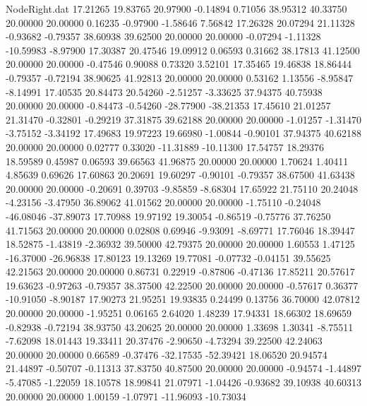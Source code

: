 \begin{filecontents}{NodeRight.dat}
  17.21265   19.83765   20.97900    -0.14894    0.71056   38.95312   40.33750   20.00000   20.00000    0.16235   -0.97900   -1.58646    7.56842
  17.26328   20.07294   21.11328    -0.93682   -0.79357   38.60938   39.62500   20.00000   20.00000   -0.07294   -1.11328  -10.59983   -8.97900
  17.30387   20.47546   19.09912     0.06593    0.31662   38.17813   41.12500   20.00000   20.00000   -0.47546    0.90088    0.73320    3.52101
  17.35465   19.46838   18.86444    -0.79357   -0.72194   38.90625   41.92813   20.00000   20.00000    0.53162    1.13556   -8.95847   -8.14991
  17.40535   20.84473   20.54260    -2.51257   -3.33625   37.94375   40.75938   20.00000   20.00000   -0.84473   -0.54260  -28.77900  -38.21353
  17.45610   21.01257   21.31470    -0.32801   -0.29219   37.31875   39.62188   20.00000   20.00000   -1.01257   -1.31470   -3.75152   -3.34192
  17.49683   19.97223   19.66980    -1.00844   -0.90101   37.94375   40.62188   20.00000   20.00000    0.02777    0.33020  -11.31889  -10.11300
  17.54757   18.29376   18.59589     0.45987    0.06593   39.66563   41.96875   20.00000   20.00000    1.70624    1.40411    4.85639    0.69626
  17.60863   20.20691   19.60297    -0.90101   -0.79357   38.67500   41.63438   20.00000   20.00000   -0.20691    0.39703   -9.85859   -8.68304
  17.65922   21.75110   20.24048    -4.23156   -3.47950   36.89062   41.01562   20.00000   20.00000   -1.75110   -0.24048  -46.08046  -37.89073
  17.70988   19.97192   19.30054    -0.86519   -0.75776   37.76250   41.71563   20.00000   20.00000    0.02808    0.69946   -9.93091   -8.69771
  17.76046   18.39447   18.52875    -1.43819   -2.36932   39.50000   42.79375   20.00000   20.00000    1.60553    1.47125  -16.37000  -26.96838
  17.80123   19.13269   19.77081    -0.07732   -0.04151   39.55625   42.21563   20.00000   20.00000    0.86731    0.22919   -0.87806   -0.47136
  17.85211   20.57617   19.63623    -0.97263   -0.79357   38.37500   42.22500   20.00000   20.00000   -0.57617    0.36377  -10.91050   -8.90187
  17.90273   21.95251   19.93835     0.24499    0.13756   36.70000   42.07812   20.00000   20.00000   -1.95251    0.06165    2.64020    1.48239
  17.94331   18.66302   18.69659    -0.82938   -0.72194   38.93750   43.20625   20.00000   20.00000    1.33698    1.30341   -8.75511   -7.62098
  18.01443   19.33411   20.37476    -2.90650   -4.73294   39.22500   42.24063   20.00000   20.00000    0.66589   -0.37476  -32.17535  -52.39421
  18.06520   20.94574   21.44897    -0.50707   -0.11313   37.83750   40.87500   20.00000   20.00000   -0.94574   -1.44897   -5.47085   -1.22059
  18.10578   18.99841   21.07971    -1.04426   -0.93682   39.10938   40.60313   20.00000   20.00000    1.00159   -1.07971  -11.96093  -10.73034

\end{filecontents}
